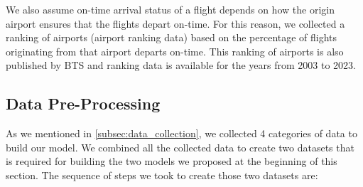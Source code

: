 We also assume on-time arrival status of a flight depends on how the origin airport ensures that the flights depart on-time.
For this reason, we collected a ranking of airports (airport ranking data) based on the percentage of flights originating from that airport departs on-time. This ranking of airports is also published by BTS \cite{airportOnTimeDep} and ranking data is available for the years from 2003 to 2023.

\subsection{Data Pre-Processing}
\label{subsec:data_preprocessing}

As we mentioned in \ref{subsec:data_collection}, we collected 4 categories of data to build our model.
We combined all the collected data to create two datasets that is required for building the two models we proposed at the beginning of this section.
The sequence of steps we took to create those two datasets are:
